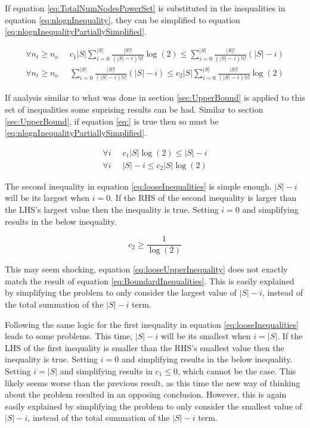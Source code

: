 \documentclass{article}
\begin{document}
If equation \ref{eq:TotalNumNodesPowerSet} is substituted in the inequalities in equation \ref{eq:nlognInequality}, they can be simplified to equation \ref{eq:nlognInequalityPartiallySimplified}.

\begin{equation}
    \begin{split}
        \forall n_t\ge n_o \;\; &
        c_1|S|\sum_{i=0}^{|S|}\frac{|S|!}{(|S|-i)!i!}
        \log \left( 2 \right)
        \le
        \sum_{i=0}^{|S|}\frac{|S|!}{(|S|-i)!i!}(|S|-i)
        \\
        \forall n_t\ge n_o \;\; &
        \sum_{i=0}^{|S|}\frac{|S|!}{(|S|-i)!i!}(|S|-i)
        \le
        c_2|S|\sum_{i=0}^{|S|}\frac{|S|!}{(|S|-i)!i!}
        \log \left( 2 \right)
    \end{split}
    \label{eq:nlognInequalityPartiallySimplified}
\end{equation}

If analysis similar to what was done in section \ref{sec:UpperBound} is applied to this set of inequalities some suprising results can be had. Similar to section \ref{sec:UpperBound}, if equation \ref{eq:} is true then so must be \ref{eq:nlognInequalityPartiallySimplified}.

\begin{equation}
	\begin{split}
		\forall i \;\; & c_1|S|\log(2)\le |S|-i \\
		\forall i \;\; & |S|-i\le c_2|S|\log(2)
	\end{split}
	\label{eq:looseInequalities}
\end{equation}

The second inequality in equation \ref{eq:looseInequalities} is simple enough. $|S|-i$ will be its largest when $i=0$. If the RHS of the second inequality is larger than the LHS's largest value then the inequality is true. Setting $i=0$ and simplifying results in the below inequality.

\begin{equation}
	c_2\ge \frac{1}{\log(2)}
	\label{eq:looseUpperInequality}
\end{equation}

This may seem shocking, equation \ref{eq:looseUpperInequality} does not exactly match the result of equation \ref{eq:BoundardInequalities}. This is easily explained by simplifying the problem to only consider the largest value of $|S|-i$, instead of the total summation of the $|S|-i$ term.

Following the same logic for the first inequality in equation \ref{eq:looseInequalities} leads to some problems. This time, $|S|-i$ will be its smallest when $i=|S|$. If the LHS of the first inequality is smaller than the RHS's smallest value then the inequality is true. Setting $i=0$ and simplifying results in the below inequality. Setting $i=|S|$ and simplifying results in $c_1\le0$, which cannot be the case. This likely seems worse than the previous result, as this time the new way of thinking about the problem resulted in an opposing conclusion. However, this is again easily explained by simplifying the problem to only consider the smallest value of $|S|-i$, instead of the total summation of the $|S|-i$ term.
\end{document}
